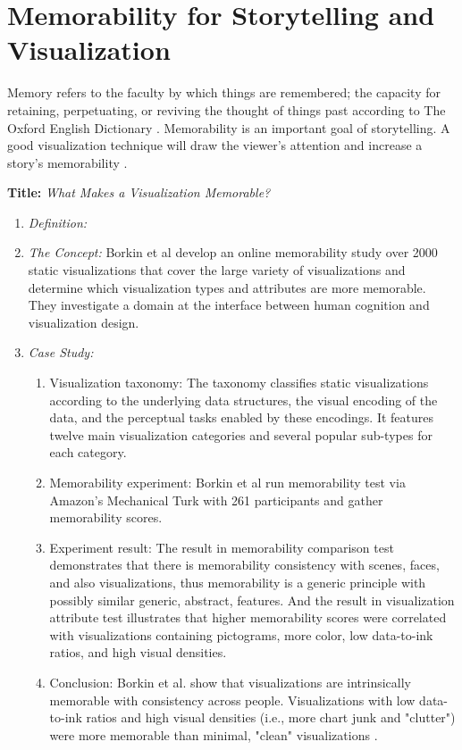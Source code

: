\documentclass{egpubl}
\begin{document}
\section{Memorability for Storytelling and Visualization}
Memory refers to the faculty by which things are remembered; the capacity for retaining, perpetuating, or reviving the thought of things past according to The Oxford English Dictionary \cite{memory}. Memorability is an important goal of storytelling. A good visualization technique will draw the viewer's attention and increase a story's memorability \cite{bateman}.

\textbf{Title:} \textit{What Makes a Visualization Memorable?}
\begin{enumerate}
\item \textit{Definition:} 
\item \textit{The Concept:} Borkin et al\cite{borkin2013makes} develop an online memorability study over 2000 static visualizations that cover the large variety of visualizations and determine which visualization types and attributes are more memorable. They investigate a domain at the interface between human cognition and visualization design.
\item \textit{Case Study:} 
\begin{enumerate}
\item Visualization taxonomy: The taxonomy classifies static visualizations according to the underlying data structures, the visual encoding of the data, and the perceptual tasks enabled by these encodings. It features twelve main visualization categories and several popular sub-types for each category.
\item Memorability experiment: Borkin et al run memorability test via Amazon's Mechanical Turk with 261 participants and gather memorability scores.
\item Experiment result: The result in memorability comparison test demonstrates that there is memorability consistency with scenes, faces, and also visualizations, thus memorability is a generic principle with possibly similar generic, abstract, features. And the result in visualization attribute test illustrates that higher memorability scores were correlated with visualizations containing pictograms, more color, low data-to-ink ratios, and high visual densities.
\item Conclusion: Borkin et al. show that visualizations are intrinsically memorable with consistency across people. Visualizations with low data-to-ink ratios and high visual densities (i.e., more chart junk and "clutter") were more memorable than minimal, "clean" visualizations \cite{borkin2013makes}. 

\end{enumerate}
\end{enumerate}
\end{document}
